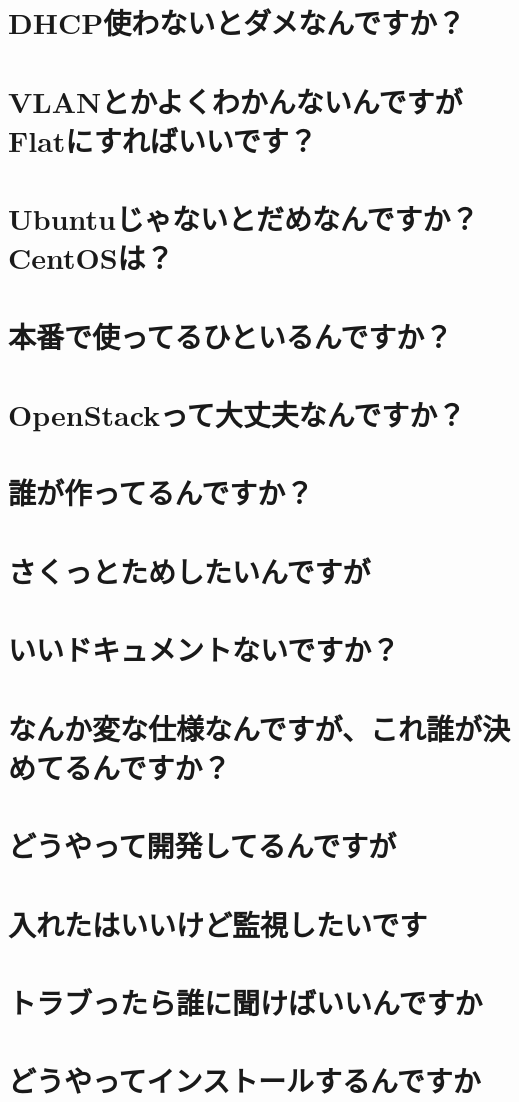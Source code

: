 \documentclass[9pt,b5paper,tombo,openany]{jsbook}
\begin{document}
\section*{DHCP使わないとダメなんですか？}
\section*{VLANとかよくわかんないんですがFlatにすればいいです？}
\section*{Ubuntuじゃないとだめなんですか？CentOSは？}
\section*{本番で使ってるひといるんですか？}
\section*{OpenStackって大丈夫なんですか？}
\section*{誰が作ってるんですか？}
\section*{さくっとためしたいんですが}
\section*{いいドキュメントないですか？}
\section*{なんか変な仕様なんですが、これ誰が決めてるんですか？}
\section*{どうやって開発してるんですが}
\section*{入れたはいいけど監視したいです}
\section*{トラブったら誰に聞けばいいんですか}
\section*{どうやってインストールするんですか}
\end{document}
